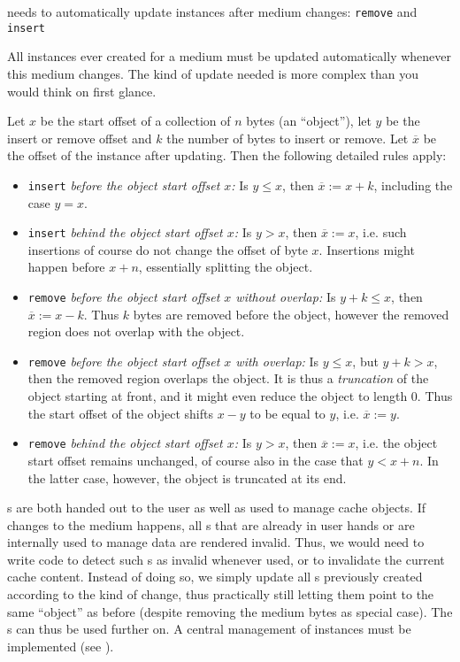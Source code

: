 {%
\COMPmedia{} needs to automatically update \IMediumReference{} instances after medium changes: \texttt{remove} and \texttt{insert}
}
{%
All \IMediumReference{} instances ever created for a medium must be updated automatically whenever this medium changes. The kind of update needed is more complex than you would think on first glance. 

Let $x$ be the start offset of a collection of $n$ bytes (an ``object''), let $y$ be the insert or remove offset and $k$ the number of bytes to insert or remove. Let $\overline{x}$ be the offset of the \IMediumReference{} instance after updating. Then the following detailed rules apply:
\begin{itemize}
\item \texttt{insert} \emph{before the object start offset $x$:} Is $y\leq x$, then $\overline{x}:=x+k$, including the case $y=x$.
\item \texttt{insert} \emph{behind the object start offset $x$:} Is $y>x$, then $\overline{x}:=x$, i.e. such insertions of course do not change the offset of byte $x$. Insertions might happen before $x+n$, essentially splitting the object.
\item \texttt{remove} \emph{before the object start offset $x$ without overlap:} Is $y+k \leq x$, then $\overline{x}:=x-k$. Thus $k$ bytes are removed before the object, however the removed region does not overlap with the object.
\item \texttt{remove} \emph{before the object start offset $x$ with overlap:} Is $y \leq x$, but $y+k > x$, then the removed region overlaps the object. It is thus a \emph{truncation} of the object starting at front, and it might even reduce the object to length 0. Thus the start offset of the object shifts $x-y$ to be equal to $y$, i.e. $\overline{x}:=y$.
\item \texttt{remove} \emph{behind the object start offset $x$:} Is $y>x$, then $\overline{x}:=x$, i.e. the object start offset remains unchanged, of course also in the case that $y<x+n$. In the latter case, however, the object is truncated at its end.
\end{itemize}
}
{%
\IMediumReference{}s are both handed out to the user as well as used to manage cache objects. If changes to the medium happens, all \IMediumReference{}s that are already in user hands or are internally used to manage data are rendered invalid. Thus, we would need to write code to detect such \IMediumReference{}s as invalid whenever used, or to invalidate the current cache content. Instead of doing so, we simply update all \IMediumReference{}s previously created according to the kind of change, thus practically still letting them point to the same ``object'' as before (despite removing the medium bytes as special case). The \IMediumReference{}s can thus be used further on.
}
{%
A central management of \IMediumReference{} instances must be implemented (see ).
}

